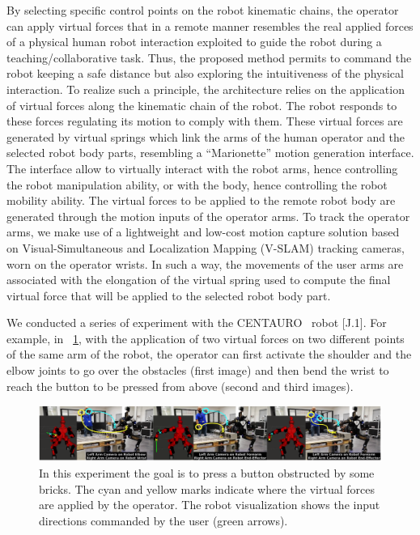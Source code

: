 By selecting specific control points on the robot kinematic chains, the operator can apply virtual forces that in a remote manner resembles the real applied forces of a physical human robot interaction exploited to guide the robot during a teaching/collaborative task. Thus, the proposed method permits to command the robot keeping a safe distance but also exploring the intuitiveness of the physical interaction. 
%
%
To realize such a principle, the architecture relies on the application of virtual forces along the kinematic chain of the robot. The robot responds to these forces regulating its motion to comply with them. These virtual forces are generated by virtual springs which link the arms of the human operator and the selected robot body parts, resembling a \enquote{Marionette} motion generation interface. The interface allow to virtually interact with the robot arms, hence controlling the robot manipulation ability, or with the body, hence controlling the robot mobility ability.
%
The virtual forces to be applied to the remote robot body are generated through the motion inputs of the operator arms. To track the operator arms, we make use of a lightweight and low-cost motion capture solution based on Visual-Simultaneous and Localization Mapping (V-SLAM) tracking cameras, worn on the operator wrists. In such a way, the movements of the user arms are associated with the elongation of the virtual spring used to compute the final virtual force that will be applied to the selected robot body part.

We conducted a series of experiment with the CENTAURO~\cite{Centauro2} robot [J.1]. For example, in \figurename~\ref{fig:tpoexp}, with the application of two virtual forces on two different points of the same arm of the robot, the operator can first activate the shoulder and the elbow joints to go over the obstacles (first image) and then bend the wrist to reach the button to be pressed from above (second and third images).   

\begin{figure}[H]
	\centering
	\includegraphics[width=0.95\linewidth]{img/tpoExp}
	\caption{In this experiment the goal is to press a button obstructed by some bricks. The cyan and yellow marks indicate where the virtual forces are applied by the operator. The robot visualization shows the input directions commanded by the user (green arrows).}
	\label{fig:tpoexp}
\end{figure}


